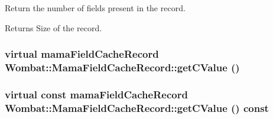 Return the number of fields present in the record. \begin{DoxyReturn}{Returns}
Size of the record. 
\end{DoxyReturn}
\hypertarget{classWombat_1_1MamaFieldCacheRecord_a03798d4fa8f54c2181763ea331a4808d}{
\subsubsection[{getCValue}]{\setlength{\rightskip}{0pt plus 5cm}virtual mamaFieldCacheRecord Wombat::MamaFieldCacheRecord::getCValue ()}}
\label{classWombat_1_1MamaFieldCacheRecord_a03798d4fa8f54c2181763ea331a4808d}
\hypertarget{classWombat_1_1MamaFieldCacheRecord_ac112360a7a4862505635b6a235f2a214}{
\subsubsection[{getCValue}]{\setlength{\rightskip}{0pt plus 5cm}virtual const mamaFieldCacheRecord Wombat::MamaFieldCacheRecord::getCValue () const}}
\label{classWombat_1_1MamaFieldCacheRecord_ac112360a7a4862505635b6a235f2a214}
